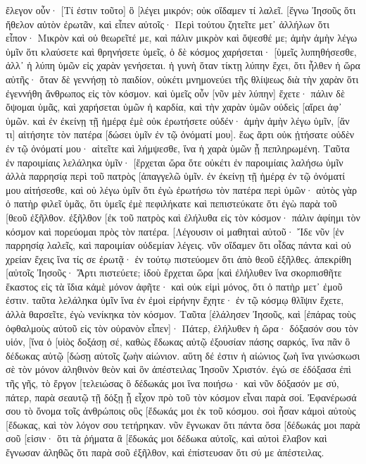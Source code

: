 ἔλεγον οὖν· [Τί ἐστιν τοῦτο] ὃ [λέγει μικρόν; οὐκ οἴδαμεν τί λαλεῖ. 
[ἔγνω Ἰησοῦς ὅτι ἤθελον αὐτὸν ἐρωτᾶν, καὶ εἶπεν αὐτοῖς· Περὶ τούτου ζητεῖτε μετ᾽ ἀλλήλων ὅτι εἶπον· Μικρὸν καὶ οὐ θεωρεῖτέ με, καὶ πάλιν μικρὸν καὶ ὄψεσθέ με; 
ἀμὴν ἀμὴν λέγω ὑμῖν ὅτι κλαύσετε καὶ θρηνήσετε ὑμεῖς, ὁ δὲ κόσμος χαρήσεται· [ὑμεῖς λυπηθήσεσθε, ἀλλ᾽ ἡ λύπη ὑμῶν εἰς χαρὰν γενήσεται. 
ἡ γυνὴ ὅταν τίκτῃ λύπην ἔχει, ὅτι ἦλθεν ἡ ὥρα αὐτῆς· ὅταν δὲ γεννήσῃ τὸ παιδίον, οὐκέτι μνημονεύει τῆς θλίψεως διὰ τὴν χαρὰν ὅτι ἐγεννήθη ἄνθρωπος εἰς τὸν κόσμον. 
καὶ ὑμεῖς οὖν [νῦν μὲν λύπην] ἔχετε· πάλιν δὲ ὄψομαι ὑμᾶς, καὶ χαρήσεται ὑμῶν ἡ καρδία, καὶ τὴν χαρὰν ὑμῶν οὐδεὶς [αἴρει ἀφ᾽ ὑμῶν. 
καὶ ἐν ἐκείνῃ τῇ ἡμέρᾳ ἐμὲ οὐκ ἐρωτήσετε οὐδέν· ἀμὴν ἀμὴν λέγω ὑμῖν, [ἄν τι] αἰτήσητε τὸν πατέρα [δώσει ὑμῖν ἐν τῷ ὀνόματί μου]. 
ἕως ἄρτι οὐκ ᾐτήσατε οὐδὲν ἐν τῷ ὀνόματί μου· αἰτεῖτε καὶ λήμψεσθε, ἵνα ἡ χαρὰ ὑμῶν ᾖ πεπληρωμένη. 
Ταῦτα ἐν παροιμίαις λελάληκα ὑμῖν· [ἔρχεται ὥρα ὅτε οὐκέτι ἐν παροιμίαις λαλήσω ὑμῖν ἀλλὰ παρρησίᾳ περὶ τοῦ πατρὸς [ἀπαγγελῶ ὑμῖν. 
ἐν ἐκείνῃ τῇ ἡμέρᾳ ἐν τῷ ὀνόματί μου αἰτήσεσθε, καὶ οὐ λέγω ὑμῖν ὅτι ἐγὼ ἐρωτήσω τὸν πατέρα περὶ ὑμῶν· 
αὐτὸς γὰρ ὁ πατὴρ φιλεῖ ὑμᾶς, ὅτι ὑμεῖς ἐμὲ πεφιλήκατε καὶ πεπιστεύκατε ὅτι ἐγὼ παρὰ τοῦ [θεοῦ ἐξῆλθον. 
ἐξῆλθον [ἐκ τοῦ πατρὸς καὶ ἐλήλυθα εἰς τὸν κόσμον· πάλιν ἀφίημι τὸν κόσμον καὶ πορεύομαι πρὸς τὸν πατέρα. 
[Λέγουσιν οἱ μαθηταὶ αὐτοῦ· Ἴδε νῦν [ἐν παρρησίᾳ λαλεῖς, καὶ παροιμίαν οὐδεμίαν λέγεις. 
νῦν οἴδαμεν ὅτι οἶδας πάντα καὶ οὐ χρείαν ἔχεις ἵνα τίς σε ἐρωτᾷ· ἐν τούτῳ πιστεύομεν ὅτι ἀπὸ θεοῦ ἐξῆλθες. 
ἀπεκρίθη [αὐτοῖς Ἰησοῦς· Ἄρτι πιστεύετε; 
ἰδοὺ ἔρχεται ὥρα [καὶ ἐλήλυθεν ἵνα σκορπισθῆτε ἕκαστος εἰς τὰ ἴδια κἀμὲ μόνον ἀφῆτε· καὶ οὐκ εἰμὶ μόνος, ὅτι ὁ πατὴρ μετ᾽ ἐμοῦ ἐστιν. 
ταῦτα λελάληκα ὑμῖν ἵνα ἐν ἐμοὶ εἰρήνην ἔχητε· ἐν τῷ κόσμῳ θλῖψιν ἔχετε, ἀλλὰ θαρσεῖτε, ἐγὼ νενίκηκα τὸν κόσμον. 
Ταῦτα [ἐλάλησεν Ἰησοῦς, καὶ [ἐπάρας τοὺς ὀφθαλμοὺς αὐτοῦ εἰς τὸν οὐρανὸν εἶπεν]· Πάτερ, ἐλήλυθεν ἡ ὥρα· δόξασόν σου τὸν υἱόν, [ἵνα ὁ [υἱὸς δοξάσῃ σέ, 
καθὼς ἔδωκας αὐτῷ ἐξουσίαν πάσης σαρκός, ἵνα πᾶν ὃ δέδωκας αὐτῷ [δώσῃ αὐτοῖς ζωὴν αἰώνιον. 
αὕτη δέ ἐστιν ἡ αἰώνιος ζωὴ ἵνα γινώσκωσι σὲ τὸν μόνον ἀληθινὸν θεὸν καὶ ὃν ἀπέστειλας Ἰησοῦν Χριστόν. 
ἐγώ σε ἐδόξασα ἐπὶ τῆς γῆς, τὸ ἔργον [τελειώσας ὃ δέδωκάς μοι ἵνα ποιήσω· 
καὶ νῦν δόξασόν με σύ, πάτερ, παρὰ σεαυτῷ τῇ δόξῃ ᾗ εἶχον πρὸ τοῦ τὸν κόσμον εἶναι παρὰ σοί. 
Ἐφανέρωσά σου τὸ ὄνομα τοῖς ἀνθρώποις οὓς [ἔδωκάς μοι ἐκ τοῦ κόσμου. σοὶ ἦσαν κἀμοὶ αὐτοὺς [ἔδωκας, καὶ τὸν λόγον σου τετήρηκαν. 
νῦν ἔγνωκαν ὅτι πάντα ὅσα [δέδωκάς μοι παρὰ σοῦ [εἰσιν· 
ὅτι τὰ ῥήματα ἃ [ἔδωκάς μοι δέδωκα αὐτοῖς, καὶ αὐτοὶ ἔλαβον καὶ ἔγνωσαν ἀληθῶς ὅτι παρὰ σοῦ ἐξῆλθον, καὶ ἐπίστευσαν ὅτι σύ με ἀπέστειλας. 
